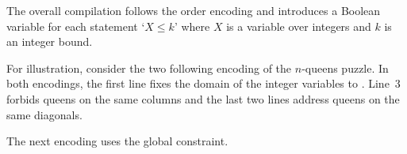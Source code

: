 The overall compilation follows the order encoding \cite{tatakiba09a,bageinscsotawe13a} and
introduces a Boolean variable for each statement `$X\leq k$' where $X$ is a variable over integers and $k$ is an integer bound.

For illustration,
consider the two following encoding of the $n$-queens puzzle.
In both encodings, the first line fixes the domain of the integer variables 
 to .
Line~3 forbids queens on the same columns and the last two lines address queens on the same diagonals.
%

The next encoding uses the global  constraint.


